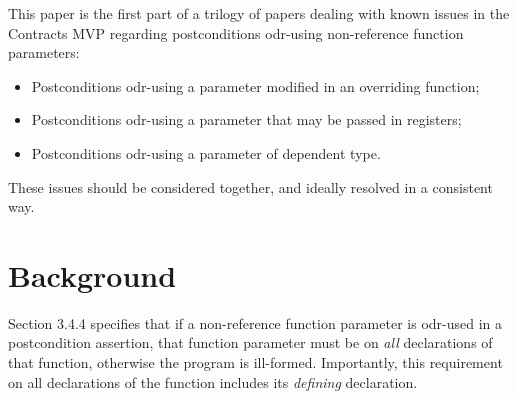 


This paper is the first part of a trilogy of papers dealing with known issues in the Contracts MVP \cite{P2900R10} regarding postconditions odr-using non-reference function parameters:
\begin{itemize}
\item \cite{D3484R2} Postconditions odr-using a parameter modified in an overriding function;
\item \cite{P3487R0} Postconditions odr-using a parameter that may be passed in registers;
\item \cite{P3489R0} Postconditions odr-using a parameter of dependent type.
\end{itemize}
These issues should be considered together, and ideally resolved in a consistent way.

\section{Background}
\label{bg}

\cite{P2900R10} Section 3.4.4 specifies that if a non-reference function parameter is odr-used in a postcondition assertion, that function parameter must be  on \emph{all} declarations of that function, otherwise the program is ill-formed.  Importantly, this requirement on all declarations of the function includes its \emph{defining} declaration.

